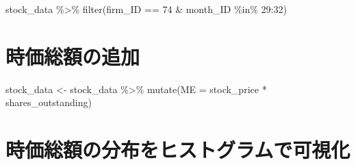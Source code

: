 \documentclass[
  letterpaper,
  DIV=11,
  numbers=noendperiod]{scrreprt}
\newenvironment{Shaded}{\begin{snugshade}}{\end{snugshade}}
\newcommand{\AttributeTok}[1]{\textcolor[rgb]{0.40,0.45,0.13}{#1}}
\newcommand{\CommentTok}[1]{\textcolor[rgb]{0.37,0.37,0.37}{#1}}
\newcommand{\DecValTok}[1]{\textcolor[rgb]{0.68,0.00,0.00}{#1}}
\newcommand{\FloatTok}[1]{\textcolor[rgb]{0.68,0.00,0.00}{#1}}
\newcommand{\FunctionTok}[1]{\textcolor[rgb]{0.28,0.35,0.67}{#1}}
\newcommand{\NormalTok}[1]{\textcolor[rgb]{0.00,0.23,0.31}{#1}}
\newcommand{\OtherTok}[1]{\textcolor[rgb]{0.00,0.23,0.31}{#1}}
\newcommand{\SpecialCharTok}[1]{\textcolor[rgb]{0.37,0.37,0.37}{#1}}
\newcommand{\StringTok}[1]{\textcolor[rgb]{0.13,0.47,0.30}{#1}}
\begin{document}
\begin{Shaded}
\begin{Highlighting}[]
\NormalTok{stock\_data }\SpecialCharTok{\%\textgreater{}\%} 
  \FunctionTok{filter}\NormalTok{(firm\_ID }\SpecialCharTok{==} \DecValTok{74} \SpecialCharTok{\&}\NormalTok{ month\_ID }\SpecialCharTok{\%in\%} \DecValTok{29}\SpecialCharTok{:}\DecValTok{32}\NormalTok{)}
\end{Highlighting}
\end{Shaded}

\section{時価総額の追加}\label{ux6642ux4fa1ux7dcfux984dux306eux8ffdux52a0}

\begin{Shaded}
\begin{Highlighting}[]
\NormalTok{stock\_data }\OtherTok{\textless{}{-}}\NormalTok{ stock\_data }\SpecialCharTok{\%\textgreater{}\%} 
  \FunctionTok{mutate}\NormalTok{(}\AttributeTok{ME =}\NormalTok{ stock\_price }\SpecialCharTok{*}\NormalTok{ shares\_outstanding)}
\end{Highlighting}
\end{Shaded}

\section{時価総額の分布をヒストグラムで可視化}\label{ux6642ux4fa1ux7dcfux984dux306eux5206ux5e03ux3092ux30d2ux30b9ux30c8ux30b0ux30e9ux30e0ux3067ux53efux8996ux5316}

\begin{Shaded}
\end{Shaded}
\end{document}
